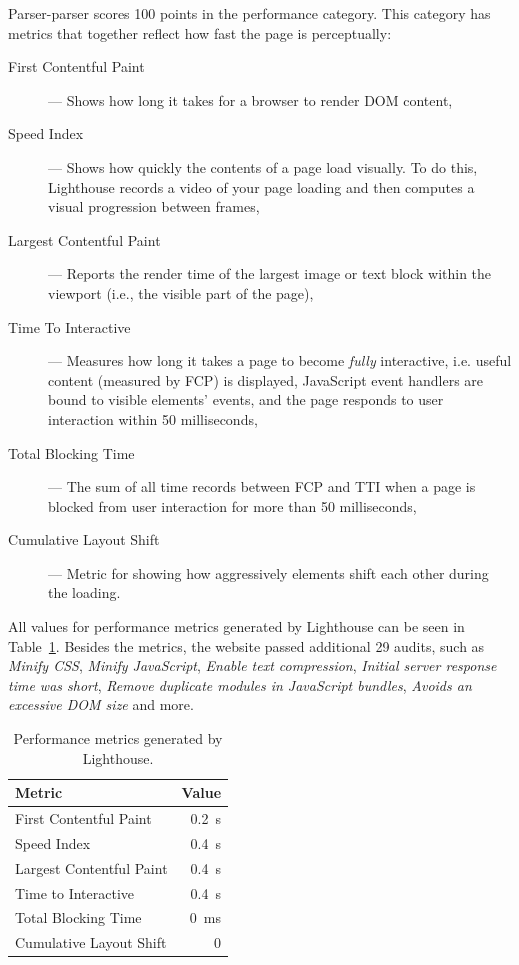 \documentclass[english,bachelors,forcepolishlogotype]{wizthesis}
\newcommand{\thisproject}{Parser-parser}
\begin{document}
\thisproject{} scores 100 points in the performance category. This category has
metrics that together reflect how fast the page is perceptually:
\begin{description}
  \item[First Contentful Paint] --- Shows how long it takes for a browser to
  render
  DOM content,
  \item[Speed Index] --- Shows how quickly the contents of a page load visually.
  To do this, Lighthouse records a video of your page loading and then computes
  a visual progression between frames,
  \item[Largest Contentful Paint] --- Reports the render time of the largest
  image or text block within the viewport (i.e., the visible part of the page),
  \item[Time To Interactive] --- Measures how long it takes a page to become
  \emph{fully} interactive, i.e. useful content (measured by FCP) is displayed,
  JavaScript event handlers are bound to visible elements' events, and the page
  responds to user interaction within 50 milliseconds,
  \item[Total Blocking Time] --- The sum of all time records between FCP and TTI
  when a page is blocked from user interaction for more than 50 milliseconds,
  \item[Cumulative Layout Shift] --- Metric for showing how aggressively
  elements shift each other during the loading.
\end{description}
All values for performance metrics generated by Lighthouse can be seen in
Table~\ref{tab:lighthouse-performance-metrics}. Besides the metrics, the website
passed additional 29 audits, such as \emph{Minify CSS}, \emph{Minify
JavaScript}, \emph{Enable text compression}, \emph{Initial server response time
was short}, \emph{Remove duplicate modules in JavaScript bundles}, \emph{Avoids
an excessive DOM size} and more.
\begin{table}[H]
  \centering
  \caption{Performance metrics generated by Lighthouse.}
  \label{tab:lighthouse-performance-metrics}
  \begin{tabular}{@{}lr@{}}
    \toprule
    Metric                   & Value                 \\ \midrule
    First Contentful Paint   & \SI{0.2}{\second}     \\
    Speed Index              & \SI{0.4}{\second}     \\
    Largest Contentful Paint & \SI{0.4}{\second}     \\
    Time to Interactive      & \SI{0.4}{\second}     \\
    Total Blocking Time      & \SI{0}{\milli\second} \\
    Cumulative Layout Shift  & 0                     \\ \bottomrule
  \end{tabular}
\end{table}
\end{document}
